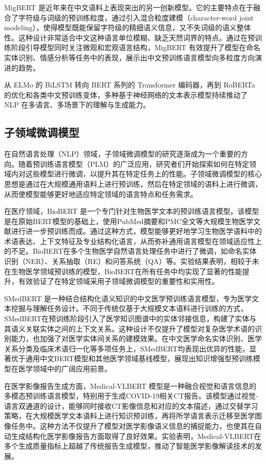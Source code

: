 \documentclass[12pt, a4paper]{ctexart}
\begin{document}
MigBERT 是近年来在中文语料上表现突出的另一创新模型。它的主要特点在于融合了字符级与词级的预训练粒度，通过引入混合粒度建模（character-word joint modeling），使得模型既能保留字符级的精细语义信息，又不失词级的语义整体性。这种设计非常适合中文这种语言单位模糊、缺乏天然词界的特点。通过在预训练阶段引导模型同时关注微观和宏观语言结构，MigBERT 有效提升了模型在命名实体识别、情感分析等任务中的表现，展示出中文预训练语言模型向多粒度方向演进的趋势\cite{liang2023characterwordbothrevisiting}。

从 ELMo 的 BiLSTM 转向 BERT 系列的 Transformer 编码器，再到 RoBERTa 的优化和各类中文预训练变体，多种基于神经网络的文本表示模型持续推动了 NLP 在多语言、多场景下的理解与生成能力。

\subsection{子领域微调模型}

在自然语言处理（NLP）领域，子领域微调模型的研究逐渐成为一个重要的方向。随着预训练语言模型（PLM）的广泛应用，研究者们开始探索如何在特定领域内对这些模型进行微调，以提升其在特定任务上的性能。子领域微调模型的核心思想是通过在大规模通用语料上进行预训练，然后在特定领域的语料上进行微调，从而使模型能够更好地适应特定领域的语言特点和任务需求。

在医疗领域，BioBERT 是一个专门针对生物医学文本的预训练语言模型\cite{Lee_2019}。该模型是在原始BERT模型的基础上，使用PubMed摘要和PMC全文等大规模生物医学文献进行进一步预训练而成。通过这种方式，模型能够更好地学习生物医学语料中的术语表达、上下文特征及专业结构化语言，从而弥补通用语言模型在领域适应性上的不足。BioBERT在多个生物医学自然语言处理任务中进行了微调，如命名实体识别（NER）、关系抽取（RE）和问答系统（QA）等。实验结果表明，相较于未在生物医学领域预训练的模型，BioBERT在所有任务中均实现了显著的性能提升，有效验证了在特定领域采用子领域微调模型的重要性和实用性。

SMedBERT 是一种结合结构化语义知识的中文医学预训练语言模型，专为医学文本挖掘与理解任务设计。不同于传统仅基于大规模文本语料进行训练的方式，SMedBERT在预训练阶段引入了医学知识图谱中的实体邻接信息，构建了实体与其语义关联实体之间的上下文关系。这种设计不仅提升了模型对复杂医学术语的识别能力，也加强了对医学实体间关系的建模效果\cite{zhang2021smedbertknowledgeenhancedpretrainedlanguage}。在中文医学命名实体识别、医学关系分类及临床术语归一化等多项任务上，SMedBERT均表现出优异的性能，显著优于通用中文BERT模型和其他医学领域基线模型，展现出知识增强型预训练模型在医学领域中的广阔应用前景。

在医学影像报告生成方面，Medical-VLBERT 模型是一种融合视觉和语言信息的多模态预训练语言模型，特别用于生成COVID-19相关CT报告\cite{Liu_2021}。该模型通过视觉-语言双通道的设计，能够同时接收CT影像信息和对应的文本描述，通过交替学习策略，在大规模医学文本语料上进行知识预训练，再将所学语言表示迁移至医学图像任务中。这种方法不仅提升了模型对医学影像语义信息的捕捉能力，也使其在自动生成结构化医学影像报告方面取得了良好效果。实验表明，Medical-VLBERT在多个生成质量指标上超越了传统报告生成模型，推动了智能医学影像解读技术的发展。
\end{document}
